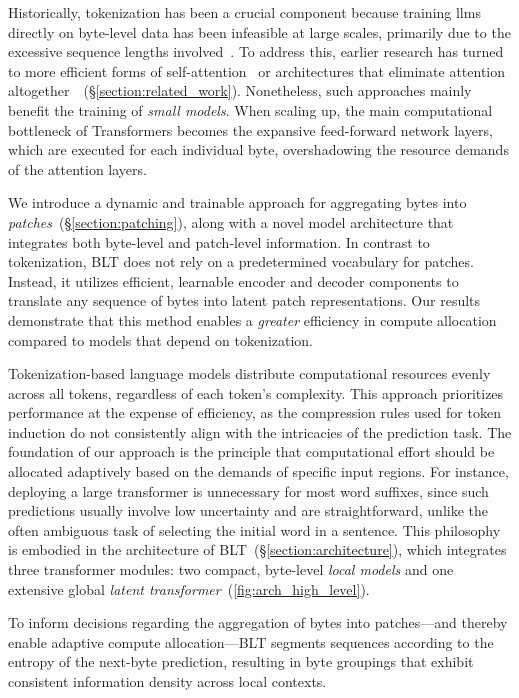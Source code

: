 Historically, tokenization has been a crucial component because training llms directly on byte-level data has been infeasible at large scales, primarily due to the excessive sequence lengths involved~\citep{xue2022byt5}. To address this, earlier research has turned to more efficient forms of self-attention~\citep{el2020characterbert, clark2022canine} or architectures that eliminate attention altogether~\citep{wang2024mambabyte}~(\S\ref{section:related_work}). Nonetheless, such approaches mainly benefit the training of \textit{small models}. When scaling up, the main computational bottleneck of Transformers becomes the expansive feed-forward network layers, which are executed for each individual byte, overshadowing the resource demands of the attention layers.

We introduce a dynamic and trainable approach for aggregating bytes into \textit{patches}~(\S\ref{section:patching}), along with a novel model architecture that integrates both byte-level and patch-level information. In contrast to tokenization, {\textsc BLT} does not rely on a predetermined vocabulary for patches. Instead, it utilizes efficient, learnable encoder and decoder components to translate any sequence of bytes into latent patch representations. Our results demonstrate that this method enables a \textit{greater} efficiency in compute allocation compared to models that depend on tokenization.

Tokenization-based language models distribute computational resources evenly across all tokens, regardless of each token's complexity. This approach prioritizes performance at the expense of efficiency, as the compression rules used for token induction do not consistently align with the intricacies of the prediction task. The foundation of our approach is the principle that computational effort should be allocated adaptively based on the demands of specific input regions. For instance, deploying a large transformer is unnecessary for most word suffixes, since such predictions usually involve low uncertainty and are straightforward, unlike the often ambiguous task of selecting the initial word in a sentence. This philosophy is embodied in the architecture of {\textsc BLT}~(\S\ref{section:architecture}), which integrates three transformer modules: two compact, byte-level \textit{local models} and one extensive global \textit{latent transformer}~(\autoref{fig:arch_high_level}). 

To inform decisions regarding the aggregation of bytes into patches—and thereby enable adaptive compute allocation—{\textsc BLT} segments sequences according to the entropy of the next-byte prediction, resulting in byte groupings that exhibit consistent information density across local contexts.

